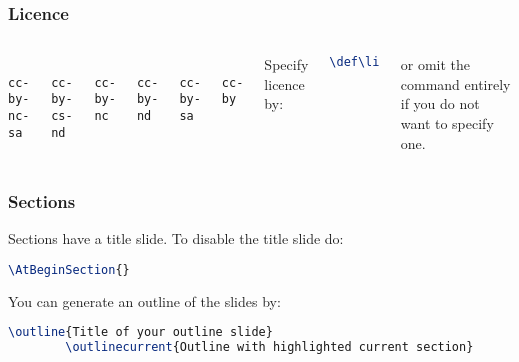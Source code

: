 \documentclass[handout,aspectratio=169]{beamer}
\def\licence{cc-by-nc-sa}
\begin{document}

\begin{frame}[fragile]
    \frametitle{Licence}

    \begin{columns}
        \centering

         \\ {\tt cc-by-nc-sa}

        \vspace{3pt} \\ {\tt cc-by-cs-nd}

        \vspace{3pt} \\ {\tt cc-by-nc}

        \centering

         \\ {\tt cc-by-nd}

        \vspace{3pt} \\ {\tt cc-by-sa}

        \vspace{3pt} \\ {\tt cc-by}

        Specify licence by:
\begin{lstlisting}[language=TeX]
\def\licence{cc-by-nc-sa}
\end{lstlisting}

    or omit the command entirely if you do not want to specify one.

    \end{columns}


\end{frame}


\begin{frame}[fragile]
    \frametitle{Sections}

    Sections have a title slide. To disable the title slide do:

    \begin{lstlisting}[language=TeX]
        \AtBeginSection{}
    \end{lstlisting}

    You can generate an outline of the slides by:

    \begin{lstlisting}[language=TeX]
        \outline{Title of your outline slide}
        \outlinecurrent{Outline with highlighted current section}
    \end{lstlisting}

\end{frame}
\end{document}
